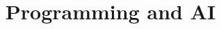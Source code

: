 \documentclass{article}
\title{Programming and AI} %
\begin{document}
	
\maketitle %
\tableofcontents
\pagebreak




























\end{document}
